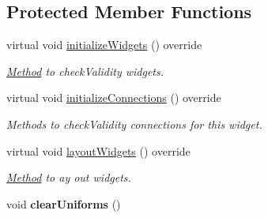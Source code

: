 \subsection*{Protected Member Functions}
\begin{DoxyCompactItemize}
\item 
\mbox{\label{classrev_1_1_view_1_1_render_uniforms_widget_a4c81df6d608ba3370020fca4ae37587a}} 
virtual void \mbox{\hyperlink{classrev_1_1_view_1_1_render_uniforms_widget_a4c81df6d608ba3370020fca4ae37587a}{initialize\+Widgets}} () override
\begin{DoxyCompactList}\small\item\em \mbox{\hyperlink{struct_method}{Method}} to check\+Validity widgets. \end{DoxyCompactList}\item 
\mbox{\label{classrev_1_1_view_1_1_render_uniforms_widget_aed8cb57092243f82d5439b1b8357973e}} 
virtual void \mbox{\hyperlink{classrev_1_1_view_1_1_render_uniforms_widget_aed8cb57092243f82d5439b1b8357973e}{initialize\+Connections}} () override
\begin{DoxyCompactList}\small\item\em Methods to check\+Validity connections for this widget. \end{DoxyCompactList}\item 
\mbox{\label{classrev_1_1_view_1_1_render_uniforms_widget_ad67acafd5aedf20b39eff01a054e86c7}} 
virtual void \mbox{\hyperlink{classrev_1_1_view_1_1_render_uniforms_widget_ad67acafd5aedf20b39eff01a054e86c7}{layout\+Widgets}} () override
\begin{DoxyCompactList}\small\item\em \mbox{\hyperlink{struct_method}{Method}} to ay out widgets. \end{DoxyCompactList}\item 
\mbox{\label{classrev_1_1_view_1_1_render_uniforms_widget_a04c508329a345aabd8ee4f1365318dd7}} 
void {\bfseries clear\+Uniforms} ()
\item 
\mbox{\label{classrev_1_1_view_1_1_render_uniforms_widget_a10af64f5392c7983401f5fd8eb6b19d1}} 

\end{DoxyCompactItemize}
